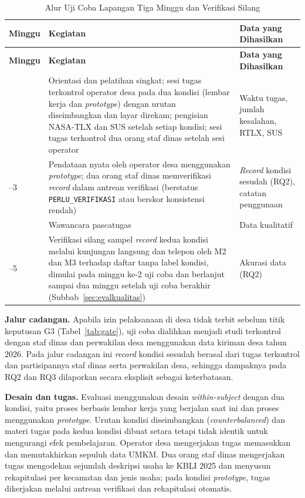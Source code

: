 {\footnotesize
\setlength{\tabcolsep}{4pt}
\renewcommand{\arraystretch}{1.15}
\begin{longtable}{|>{\centering\arraybackslash}p{}|L{0.52\textwidth}|L{0.26\textwidth}|}
\caption{Alur Uji Coba Lapangan Tiga Minggu dan Verifikasi Silang}
\label{tab:alur}\\
\hline
\textbf{Minggu} & \textbf{Kegiatan} & \textbf{Data yang Dihasilkan} \\ \hline
\endfirsthead
\hline
\textbf{Minggu} & \textbf{Kegiatan} & \textbf{Data yang Dihasilkan} \\ \hline
{} & Orientasi dan pelatihan singkat; sesi tugas terkontrol operator desa pada dua kondisi (lembar kerja dan \textit{prototype}) dengan urutan diseimbangkan dan layar direkam; pengisian NASA-TLX dan SUS setelah setiap kondisi; sesi tugas terkontrol dua orang staf dinas setelah sesi operator & Waktu tugas, jumlah kesalahan, RTLX, SUS \\ --3 & Pendataan nyata oleh operator desa menggunakan \textit{prototype}; dua orang staf dinas memverifikasi \textit{record} dalam antrean verifikasi (berstatus \texttt{PERLU\_VERIFIKASI} atau berskor konsistensi rendah) & \textit{Record} kondisi sesudah (RQ2), catatan penggunaan \\  & Wawancara pascatugas & Data kualitatif \\ --5 & Verifikasi silang sampel \textit{record} kedua kondisi melalui kunjungan langsung dan telepon oleh M2 dan M3 terhadap daftar tanpa label kondisi, dimulai pada minggu ke-2 uji coba dan berlanjut sampai dua minggu setelah uji coba berakhir (Subbab~\ref{sec:evalkualitas}) & Akurasi data (RQ2) \\ \hline
\end{longtable}
}

\textbf{Jalur cadangan.} Apabila izin pelaksanaan di desa tidak terbit sebelum titik keputusan G3 (Tabel~\ref{tab:gate}), uji coba dialihkan menjadi studi terkontrol dengan staf dinas dan perwakilan desa menggunakan data kiriman desa tahun 2026.
Pada jalur cadangan ini \textit{record} kondisi sesudah berasal dari tugas terkontrol dan partisipannya staf dinas serta perwakilan desa, sehingga dampaknya pada RQ2 dan RQ3 dilaporkan secara eksplisit sebagai keterbatasan.

\textbf{Desain dan tugas.} Evaluasi menggunakan desain \textit{within-subject} dengan dua kondisi, yaitu proses berbasis lembar kerja yang berjalan saat ini dan proses menggunakan \textit{prototype}. Urutan kondisi diseimbangkan (\textit{counterbalanced}) dan materi tugas pada kedua kondisi dibuat setara tetapi tidak identik untuk mengurangi efek pembelajaran. Operator desa mengerjakan tugas memasukkan dan memutakhirkan sepuluh data UMKM. Dua orang staf dinas mengerjakan tugas mengodekan sejumlah deskripsi usaha ke KBLI 2025 dan menyusun rekapitulasi per kecamatan dan jenis usaha; pada kondisi \textit{prototype}, tugas dikerjakan melalui antrean verifikasi dan rekapitulasi otomatis.

